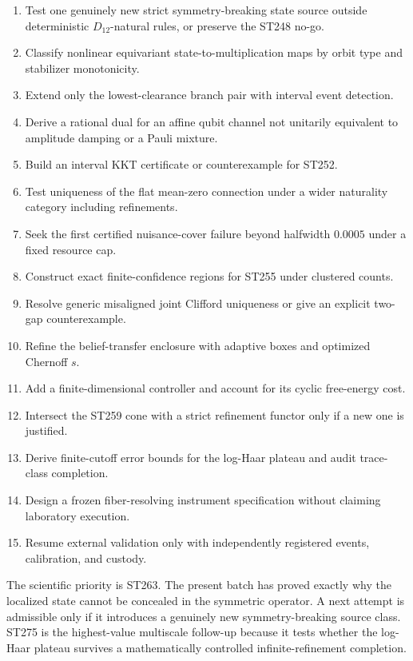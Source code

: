\documentclass[11pt,a4paper]{article}
\begin{document}
\begin{enumerate}
\item[\textbf{ST263}.] Test one genuinely new strict symmetry-breaking state source outside
deterministic $D_{12}$-natural rules, or preserve the ST248 no-go.
\item[\textbf{ST264}.] Classify nonlinear equivariant state-to-multiplication maps by orbit
type and stabilizer monotonicity.
\item[\textbf{ST265}.] Extend only the lowest-clearance branch pair with interval event
detection.
\item[\textbf{ST266}.] Derive a rational dual for an affine qubit channel not unitarily
equivalent to amplitude damping or a Pauli mixture.
\item[\textbf{ST267}.] Build an interval KKT certificate or counterexample for ST252.
\item[\textbf{ST268}.] Test uniqueness of the flat mean-zero connection under a wider
naturality category including refinements.
\item[\textbf{ST269}.] Seek the first certified nuisance-cover failure beyond halfwidth
$0.0005$ under a fixed resource cap.
\item[\textbf{ST270}.] Construct exact finite-confidence regions for ST255 under clustered
counts.
\item[\textbf{ST271}.] Resolve generic misaligned joint Clifford uniqueness or give an
explicit two-gap counterexample.
\item[\textbf{ST272}.] Refine the belief-transfer enclosure with adaptive boxes and
optimized Chernoff $s$.
\item[\textbf{ST273}.] Add a finite-dimensional controller and account for its cyclic
free-energy cost.
\item[\textbf{ST274}.] Intersect the ST259 cone with a strict refinement functor only if a
new one is justified.
\item[\textbf{ST275}.] Derive finite-cutoff error bounds for the log-Haar plateau and audit
trace-class completion.
\item[\textbf{ST276}.] Design a frozen fiber-resolving instrument specification without
claiming laboratory execution.
\item[\textbf{ST277}.] Resume external validation only with independently registered
events, calibration, and custody.
\end{enumerate}

The scientific priority is ST263. The present batch has proved exactly why the localized
state cannot be concealed in the symmetric operator. A next attempt is admissible only if
it introduces a genuinely new symmetry-breaking source class. ST275 is the highest-value
multiscale follow-up because it tests whether the log-Haar plateau survives a mathematically
controlled infinite-refinement completion.
\end{document}

